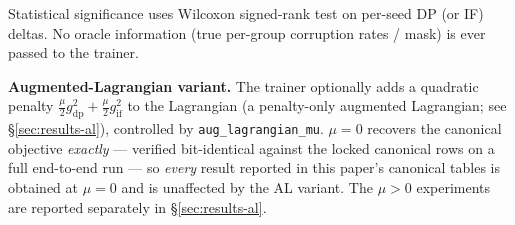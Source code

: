 Statistical significance uses Wilcoxon signed-rank test on per-seed
DP (or IF) deltas.  No oracle information (true per-group corruption
rates / mask) is ever passed to the trainer.

\textbf{Augmented-Lagrangian variant.}
The trainer optionally adds a quadratic penalty
$\tfrac{\mu}{2}g_{\mathrm{dp}}^{2}+\tfrac{\mu}{2}g_{\mathrm{if}}^{2}$ to
the Lagrangian (a penalty-only augmented Lagrangian; see
\S\ref{sec:results-al}), controlled by \texttt{aug\_lagrangian\_mu}.
$\mu{=}0$ recovers the canonical objective
\emph{exactly} --- verified bit-identical against the locked canonical
rows on a full end-to-end run --- so \emph{every} result reported in
this paper's canonical tables is obtained at $\mu{=}0$ and is
unaffected by the AL variant.  The $\mu{>}0$ experiments are reported
separately in \S\ref{sec:results-al}.
